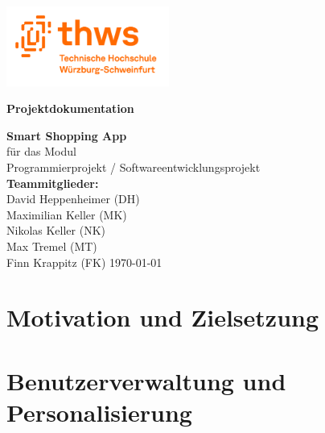 \documentclass[12pt, a4paper]{report} %
\newcommand{\authorinitials}{} %
\begin{document}
\begin{titlepage}
    \begin{center}
        \includegraphics[width=0.4\textwidth]{media/THWS_logo.png}
    \end{center}
    \centering
    \vspace*{2cm}
    {\LARGE\bfseries Projektdokumentation \par}
    \vspace{1.5cm}
    {\Large \textbf{Smart Shopping App} \\[3mm]}
    \vspace{1cm}
    {\large für das Modul\\
      Programmierprojekt / Softwareentwicklungsprojekt\\}
    \vspace{1.5cm}
    {\large
      \textbf{Teammitglieder:}\\[5mm]
      David Heppenheimer (DH)\\
      Maximilian Keller (MK)\\
      Nikolas Keller (NK)\\
      Max Tremel (MT)\\
      Finn Krappitz (FK)
    }
    \vfill
    {\large \today}
\end{titlepage}

\tableofcontents
\cleardoublepage

\chapter{Motivation und Zielsetzung}











  




\chapter{Benutzerverwaltung und Personalisierung}
\renewcommand{\authorinitials}{FK}





\end{document}
